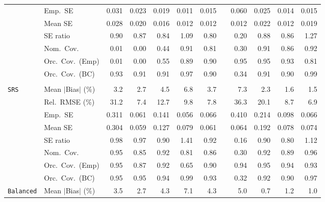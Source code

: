 \begin{landscape}
\begin{longtable}{llrrrrrrrrrr}
 & Emp.\ SE & 0.031 & 0.023 & 0.019 & 0.011 & 0.015 &  & 0.060 & 0.025 & 0.014 & 0.015 \\
 & Mean SE & 0.028 & 0.020 & 0.016 & 0.012 & 0.012 &  & 0.012 & 0.022 & 0.012 & 0.019 \\
 & SE ratio & \cellcolor{ranktwo}0.90 & 0.87 & 0.84 & \cellcolor{rankone}1.09 & 0.80 &  & 0.20 & \cellcolor{rankthree}0.88 & 0.86 & 1.27 \\
 & Nom.\ Cov. & 0.01 & 0.00 & 0.44 & \cellcolor{ranktwo}0.91 & 0.81 &  & 0.30 & \cellcolor{rankthree}0.91 & 0.86 & \cellcolor{rankone}0.92 \\
 & Orc.\ Cov.\ (Emp) & 0.01 & 0.00 & 0.55 & 0.89 & 0.90 &  & \cellcolor{rankone}0.95 & \cellcolor{ranktwo}0.95 & \cellcolor{rankthree}0.93 & 0.81 \\
 & Orc.\ Cov.\ (BC) & \cellcolor{rankone}0.93 & 0.91 & 0.91 & \cellcolor{ranktwo}0.97 & 0.90 &  & 0.34 & 0.91 & 0.90 & \cellcolor{rankthree}0.99 \\
\addlinespace[2pt]
\multicolumn{12}{l}{\textbf{Binary \& Categorical Phase-One Covariates}} \\
\addlinespace[2pt]
\quad \texttt{SRS} & Mean $|$Bias$|$ (\%) & 3.2 & 2.7 & 4.5 & 6.8 & 3.7 &  & 7.3 & \cellcolor{rankthree}2.3 & \cellcolor{ranktwo}1.6 & \cellcolor{rankone}1.5 \\
 & Rel.\ RMSE (\%) & 31.2 & \cellcolor{ranktwo}7.4 & 12.7 & 9.8 & \cellcolor{rankthree}7.8 &  & 36.3 & 20.1 & 8.7 & \cellcolor{rankone}6.9 \\
 & Emp.\ SE & 0.311 & 0.061 & 0.141 & 0.056 & 0.066 &  & 0.410 & 0.214 & 0.098 & 0.066 \\
 & Mean SE & 0.304 & 0.059 & 0.127 & 0.079 & 0.061 &  & 0.064 & 0.192 & 0.078 & 0.074 \\
 & SE ratio & \cellcolor{rankone}0.98 & \cellcolor{ranktwo}0.97 & 0.90 & 1.41 & \cellcolor{rankthree}0.92 &  & 0.16 & 0.90 & 0.80 & 1.12 \\
 & Nom.\ Cov. & \cellcolor{rankone}0.95 & 0.85 & 0.92 & 0.81 & 0.86 &  & 0.30 & \cellcolor{rankthree}0.92 & 0.89 & \cellcolor{ranktwo}0.96 \\
 & Orc.\ Cov.\ (Emp) & \cellcolor{ranktwo}0.95 & 0.87 & 0.92 & 0.65 & 0.90 &  & 0.94 & \cellcolor{rankone}0.95 & \cellcolor{rankthree}0.94 & 0.93 \\
 & Orc.\ Cov.\ (BC) & \cellcolor{ranktwo}0.95 & \cellcolor{rankone}0.95 & \cellcolor{rankthree}0.94 & 0.99 & 0.93 &  & 0.32 & 0.92 & 0.90 & 0.97 \\
\addlinespace[2pt]
\quad \texttt{Balanced} & Mean $|$Bias$|$ (\%) & 3.5 & 2.7 & 4.3 & 7.1 & 4.3 &  & 5.0 & \cellcolor{rankone}0.7 & \cellcolor{rankthree}1.2 & \cellcolor{ranktwo}1.0 \\

\end{longtable}
\end{landscape}
